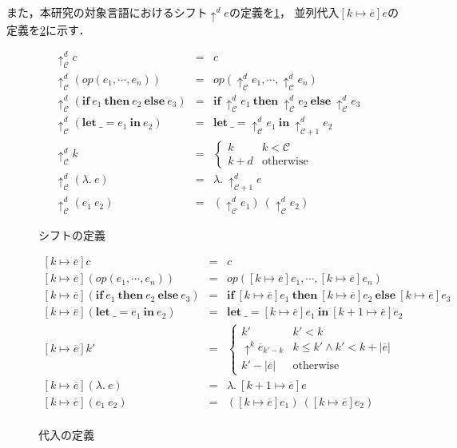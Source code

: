\documentclass{sumiilab-paper}
\newcommand{\keyword}[1]{\mathbf{#1}}
\newcommand{\IF}{\keyword{if}}
\newcommand{\THEN}{\keyword{then}}
\newcommand{\ELSE}{\keyword{else}}
\newcommand{\LET}{\keyword{let}}
\newcommand{\IN}{\keyword{in}}
\begin{document}
また，本研究の対象言語におけるシフト$\uparrow^d e$の定義を\figurename\ref{eqn:target-shift}，
並列代入$[k\mapsto \overline{e}]e$の定義を\figurename\ref{eqn:target-subst}に示す．
\begin{figure}[htbp]
	\[ \begin{array}{lll}
			\uparrow^d_\mathcal{C} c & = & c \\
			\uparrow^d_\mathcal{C} (\textit{op} (e_1,\cdots,e_n)) & = & \textit{op} (\uparrow^d_\mathcal{C} e_1,\cdots,\uparrow^d_\mathcal{C} e_n) \\
			\uparrow^d_\mathcal{C} (\IF~e_1~\THEN~e_2~\ELSE~e_3) & = & \IF~\uparrow^d_\mathcal{C} e_1~\THEN~\uparrow^d_\mathcal{C} e_2~\ELSE~\uparrow^d_\mathcal{C} e_3 \\
			\uparrow^d_\mathcal{C} (\LET~\_=e_1~\IN~e_2) & = & \LET~\_=\uparrow^d_\mathcal{C} e_1~\IN~\uparrow^d_{\mathcal{C} + 1}e_2 \\
			\uparrow^d_\mathcal{C} k & = & \left \{ \begin{array}{ll} k & k < \mathcal{C} \\ k + d & \mbox{otherwise} \end{array} \right. \\
			\uparrow^d_\mathcal{C} (\lambda.~e) & = & \lambda.~\uparrow^d_{\mathcal{C}+1} e \\
			\uparrow^d_\mathcal{C} (e_1~e_2) & = & (\uparrow^d_\mathcal{C} e_1)~(\uparrow^d_\mathcal{C} e_2)
	\end{array} \]
	\caption{シフトの定義}
	\label{eqn:target-shift}
\end{figure}

\begin{figure}[htbp]
	\[ \begin{array}{lll}
			[k \mapsto \overline{e}]c & = & c \\
			\left[k \mapsto \overline{e}\right] (\textit{op} (e_1, \cdots , e_n)) & = & \textit{op} ([k \mapsto \overline{e}]e_1,\cdots , [k \mapsto \overline{e}]e_n) \\
			\left[k \mapsto \overline{e}\right](\IF~e_1~\THEN~e_2~\ELSE~e_3) & = &  \IF~[k \mapsto \overline{e}]e_1~\THEN~[k \mapsto \overline{e}]e_2~\ELSE~[k \mapsto \overline{e}]e_3 \\
			\left[k \mapsto \overline{e}\right](\LET~\_=e_1~\IN~e_2) & = & \LET~\_=[k \mapsto \overline{e}]e_1~\IN~[k + 1 \mapsto \overline{e}]e_2 \\
		\left[k \mapsto \overline{e}\right]k' & = & \left\{ \begin{array}{ll} k' & k' < k \\ \uparrow^k \overline{e}_{k'-k} & k \leq k' \land k' < k + |\overline{e}| \\ k' - |\overline{e}| & \mbox{otherwise} \end{array} \right. \\
			\left[k \mapsto \overline{e}\right](\lambda.~e) & = & \lambda.~[k + 1 \mapsto \overline{e}]e \\
			\left[k \mapsto \overline{e}\right](e_1~e_2) & = & ([k \mapsto \overline{e}]e_1)~([k \mapsto \overline{e}]e_2) \\
	\end{array} \]
	\caption{代入の定義}
	\label{eqn:target-subst}
\end{figure}
\end{document}

